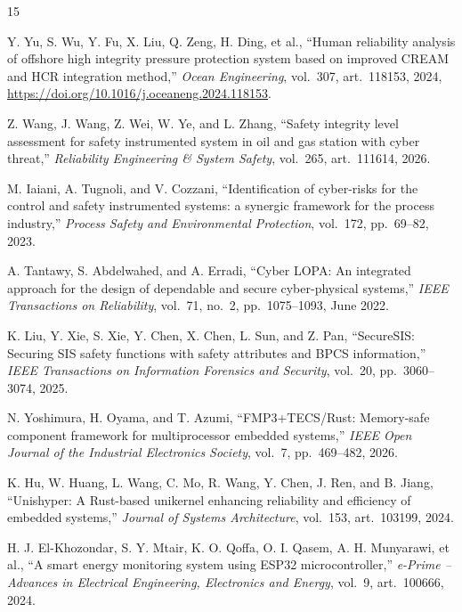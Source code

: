 \documentclass[11pt,a4paper]{article}
\begin{document}
\begin{thebibliography}{15}
\small

Y. Yu, S. Wu, Y. Fu, X. Liu, Q. Zeng, H. Ding, et al.,
``Human reliability analysis of offshore high integrity pressure protection system based on improved CREAM and HCR integration method,''
\textit{Ocean Engineering}, vol.\ 307, art.\ 118153, 2024,
\url{https://doi.org/10.1016/j.oceaneng.2024.118153}.

Z. Wang, J. Wang, Z. Wei, W. Ye, and L. Zhang,
``Safety integrity level assessment for safety instrumented system in oil and gas station with cyber threat,''
\textit{Reliability Engineering \& System Safety}, vol.\ 265, art.\ 111614, 2026.

M. Iaiani, A. Tugnoli, and V. Cozzani,
``Identification of cyber-risks for the control and safety instrumented systems: a synergic framework for the process industry,''
\textit{Process Safety and Environmental Protection}, vol.\ 172, pp.\ 69--82, 2023.

A. Tantawy, S. Abdelwahed, and A. Erradi,
``Cyber LOPA: An integrated approach for the design of dependable and secure cyber-physical systems,''
\textit{IEEE Transactions on Reliability}, vol.\ 71, no.\ 2, pp.\ 1075--1093, June 2022.

K. Liu, Y. Xie, S. Xie, Y. Chen, X. Chen, L. Sun, and Z. Pan,
``SecureSIS: Securing SIS safety functions with safety attributes and BPCS information,''
\textit{IEEE Transactions on Information Forensics and Security}, vol.\ 20, pp.\ 3060--3074, 2025.

N. Yoshimura, H. Oyama, and T. Azumi,
``FMP3+TECS/Rust: Memory-safe component framework for multiprocessor embedded systems,''
\textit{IEEE Open Journal of the Industrial Electronics Society}, vol.\ 7, pp.\ 469--482, 2026.

K. Hu, W. Huang, L. Wang, C. Mo, R. Wang, Y. Chen, J. Ren, and B. Jiang,
``Unishyper: A Rust-based unikernel enhancing reliability and efficiency of embedded systems,''
\textit{Journal of Systems Architecture}, vol.\ 153, art.\ 103199, 2024.

H. J. El-Khozondar, S. Y. Mtair, K. O. Qoffa, O. I. Qasem, A. H. Munyarawi, et al.,
``A smart energy monitoring system using ESP32 microcontroller,''
\textit{e-Prime -- Advances in Electrical Engineering, Electronics and Energy}, vol.\ 9, art.\ 100666, 2024.


\end{thebibliography}
\end{document}
